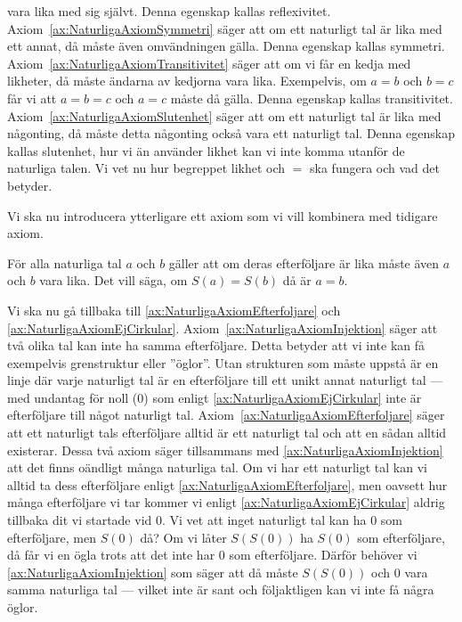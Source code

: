 vara lika med sig självt.
Denna egenskap kallas reflexivitet.
Axiom~\ref{ax:NaturligaAxiomSymmetri} säger att om ett naturligt tal är lika
med ett annat, då måste även omvändningen gälla.
Denna egenskap kallas symmetri.
Axiom~\ref{ax:NaturligaAxiomTransitivitet} säger att om vi får en kedja med
likheter, då måste ändarna av kedjorna vara lika.
Exempelvis, om \(a=b\) och \(b=c\) får vi att \(a=b=c\) och \(a=c\) måste då
gälla.
Denna egenskap kallas transitivitet.
Axiom~\ref{ax:NaturligaAxiomSlutenhet} säger att om ett naturligt tal är lika
med någonting, då måste detta någonting också vara ett naturligt tal.
Denna egenskap kallas slutenhet, hur vi än använder likhet kan
vi inte komma utanför de naturliga talen.
Vi vet nu hur begreppet likhet och \(=\) ska fungera och vad det betyder.

Vi ska nu introducera ytterligare ett axiom som vi vill kombinera med
tidigare axiom.
\begin{axiom}\label{ax:NaturligaAxiomInjektion}
  För alla naturliga tal \(a\) och \(b\) gäller att om deras efterföljare är
  lika måste även \(a\) och \(b\) vara lika.
  Det vill säga, om \(S(a)=S(b)\) då är \(a=b\).
\end{axiom}
Vi ska nu gå tillbaka till \cref{ax:NaturligaAxiomEfterfoljare} och
\cref{ax:NaturligaAxiomEjCirkular}.
Axiom~\ref{ax:NaturligaAxiomInjektion} säger att två olika tal kan inte ha 
samma efterföljare.
Detta betyder att vi inte kan få exempelvis grenstruktur eller ''öglor''.
Utan strukturen som måste uppstå är en linje där varje naturligt tal är en 
efterföljare till ett unikt annat naturligt tal --- med undantag för noll 
(\(0\)) som enligt \cref{ax:NaturligaAxiomEjCirkular} inte är efterföljare 
till något naturligt tal.
Axiom~\ref{ax:NaturligaAxiomEfterfoljare} säger att ett naturligt tals 
efterföljare alltid är ett naturligt tal och att en sådan alltid existerar.
Dessa två axiom säger tillsammans med \cref{ax:NaturligaAxiomInjektion} att
det finns oändligt många naturliga tal.
Om vi har ett naturligt tal kan vi alltid ta dess efterföljare enligt 
\cref{ax:NaturligaAxiomEfterfoljare}, men oavsett hur många efterföljare 
vi tar kommer vi enligt \cref{ax:NaturligaAxiomEjCirkular} aldrig tillbaka 
dit vi startade vid \(0\).
Vi vet att inget naturligt tal kan ha \(0\) som efterföljare, men \(S(0)\) då?
Om vi låter \(S(S(0))\) ha \(S(0)\) som efterföljare, då får vi en ögla trots
att det inte har \(0\) som efterföljare.
Därför behöver vi \cref{ax:NaturligaAxiomInjektion} som säger att då måste
\(S(S(0))\) och \(0\) vara samma naturliga tal --- vilket inte är sant och
följaktligen kan vi inte få några öglor.

